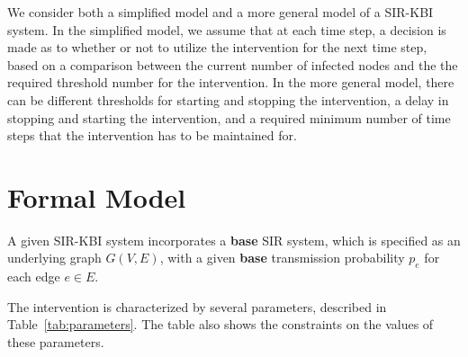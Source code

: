 \documentclass[11pt]{article}
\begin{document}
 We consider both a simplified model and a more general model of a SIR-KBI system.
 In the simplified model, we assume that at each time step, 
  a decision is made as to whether or not to utilize the  intervention for the next time step,
  based on a comparison between the current number of infected nodes
   and the the required threshold number for the intervention.
  In the more general model, 
  there can be different thresholds for starting and stopping the intervention,
  a delay in stopping and starting the intervention,
  and a required minimum number of time steps that the intervention has to be maintained for.
  
  

 

\section{Formal Model}
\label{sec:formal_model}



A given SIR-KBI system incorporates a {\bf base} SIR system,
which is specified as an underlying graph $G(V,E)$, with
a given {\bf base} transmission probability $p_e$ for each edge $e \in E$. 
 
The intervention is characterized by several parameters, described in
Table~\ref{tab:parameters}.
The table also shows the constraints on the values of 
these parameters.

\smallskip
\end{document}
